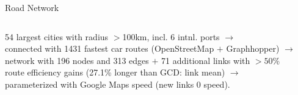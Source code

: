 \documentclass[aspectratio=169,xcolor=dvipsnames]{beamer}
\begin{document}
\begin{frame}{Road Network} \vspace{-3mm}
\begin{adjustbox}{center}
    \begin{columns} \setlength{\columnsep}{1mm} %
        \begin{column}{0.22\textwidth}
\small 54 largest cities with radius $>$100km, incl. 6 intnl. ports $\to$\\\vspace{2mm} connected with 1431 fastest car routes (OpenStreetMap $+$ Graphhopper) $\to$\\\vspace{2mm} network with 196 nodes and 313 edges $+$ 71 additional links with $>50$\% route efficiency gains (27.1\% longer than GCD: link mean) $\to$\\\vspace{2mm} parameterized with Google Maps speed (new links 0 speed).
        \end{column}
        \begin{column}{0.9\textwidth}
\end{column}
\end{columns}
\end{adjustbox}
\end{frame}
\end{document}
